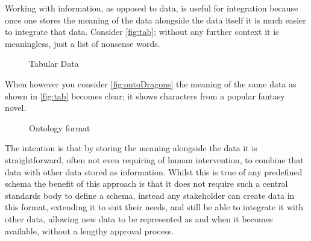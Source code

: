Working with information, as opposed to data, is useful for integration because once one stores the meaning of the data alongside the data itself it is much easier to integrate that data. Consider \autoref{fig:tab}; without any further context it is meaningless, just a list of nonsense words.

\begin{figure}[!htbp]
\myfloatalign
{}
\caption{Tabular Data}
\label{fig:tab}
\end{figure}

 When however you consider \autoref{fig:ontoDragons} the meaning of the same data as shown in \autoref{fig:tab} becomes clear; it shows characters from a popular fantasy novel. 

\begin{figure}[!htbp]
\myfloatalign
{}
\caption{Ontology format}
\label{fig:ontoDragons}
\end{figure}

The intention is that by storing the meaning alongside the data it is straightforward, often not even requiring of human intervention, to combine that data with other data stored as information. Whilst this is true of any predefined schema the benefit of this approach is that it does not require such a central standards body to define a schema, instead any stakeholder can create data in this format, extending it to suit their needs, and still be able to integrate it with other data, allowing new data to be represented as and when it becomes available, without a lengthy approval process. 


